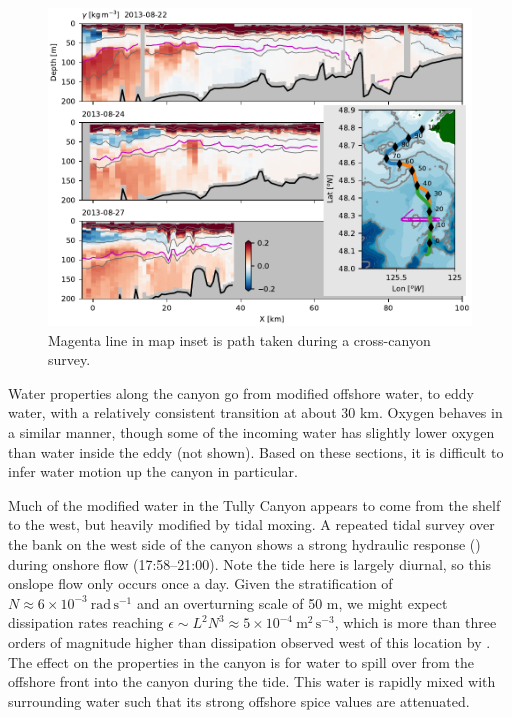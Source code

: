 \documentclass[draft]{agujournal2019}
\begin{document}
\begin{figure}[htbp]
  \begin{center}
    \includegraphics[width=6.2in]{CanyonPropertiesSpice}
    \caption{Magenta line in map inset is path taken during a cross-canyon survey.
      \label{fig:CanyonPropertiesSpice} }
  \end{center}
\end{figure}

Water properties along the canyon go from modified offshore water, to eddy water, with a relatively consistent transition at about 30 km.  Oxygen behaves in a similar manner, though some of the incoming water has slightly lower oxygen than water inside the eddy (not shown).  Based on these sections, it is difficult to infer water motion up the canyon in particular.

Much of the modified water in the Tully Canyon appears to come from the shelf to the west, but heavily modified by tidal moxing. A repeated tidal survey over the bank on the west side of the canyon shows a strong hydraulic response () during onshore flow (17:58--21:00).  Note the tide here is largely diurnal, so this onslope flow only occurs once a day.  Given the stratification of $N\approx 6\times10^{-3} \ \mathrm{rad\,s^{-1}}$ and an overturning scale of 50 m, we might expect dissipation rates reaching $\epsilon \sim L^2N^{3} \approx 5\times10^{-4}\ \mathrm{m^2\,s^{-3}}$, which is more than three orders of magnitude higher than dissipation observed west of this location by \cite{deweycrawford88}.  The effect on the properties in the canyon is for water to spill over from the offshore front into the canyon during the tide.  This water is rapidly mixed with surrounding water such that its strong offshore spice values are attenuated.
\end{document}
